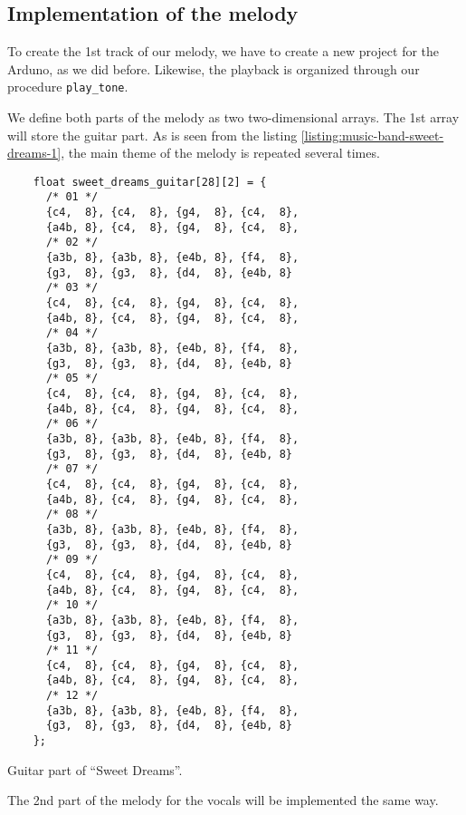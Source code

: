 \documentclass[../sparc.tex]{subfiles}
\begin{document}
\newpage
\subsection{Implementation of the melody}

To create the 1st track of our melody, we have to create a new project for the
Arduno, as we did before.  Likewise, the playback is organized through our
procedure \texttt{play\_tone}.

We define both parts of the melody as two two-dimensional arrays.  The 1st array
will store the guitar part.  As is seen from the listing
\ref{listing:music-band-sweet-dreams-1}, the main theme of the melody is
repeated several times.

\begin{listing}[H]
  \begin{verbatim}
    float sweet_dreams_guitar[28][2] = {
      /* 01 */
      {c4,  8}, {c4,  8}, {g4,  8}, {c4,  8},
      {a4b, 8}, {c4,  8}, {g4,  8}, {c4,  8},
      /* 02 */
      {a3b, 8}, {a3b, 8}, {e4b, 8}, {f4,  8},
      {g3,  8}, {g3,  8}, {d4,  8}, {e4b, 8}
      /* 03 */
      {c4,  8}, {c4,  8}, {g4,  8}, {c4,  8},
      {a4b, 8}, {c4,  8}, {g4,  8}, {c4,  8},
      /* 04 */
      {a3b, 8}, {a3b, 8}, {e4b, 8}, {f4,  8},
      {g3,  8}, {g3,  8}, {d4,  8}, {e4b, 8}
      /* 05 */
      {c4,  8}, {c4,  8}, {g4,  8}, {c4,  8},
      {a4b, 8}, {c4,  8}, {g4,  8}, {c4,  8},
      /* 06 */
      {a3b, 8}, {a3b, 8}, {e4b, 8}, {f4,  8},
      {g3,  8}, {g3,  8}, {d4,  8}, {e4b, 8}
      /* 07 */
      {c4,  8}, {c4,  8}, {g4,  8}, {c4,  8},
      {a4b, 8}, {c4,  8}, {g4,  8}, {c4,  8},
      /* 08 */
      {a3b, 8}, {a3b, 8}, {e4b, 8}, {f4,  8},
      {g3,  8}, {g3,  8}, {d4,  8}, {e4b, 8}
      /* 09 */
      {c4,  8}, {c4,  8}, {g4,  8}, {c4,  8},
      {a4b, 8}, {c4,  8}, {g4,  8}, {c4,  8},
      /* 10 */
      {a3b, 8}, {a3b, 8}, {e4b, 8}, {f4,  8},
      {g3,  8}, {g3,  8}, {d4,  8}, {e4b, 8}
      /* 11 */
      {c4,  8}, {c4,  8}, {g4,  8}, {c4,  8},
      {a4b, 8}, {c4,  8}, {g4,  8}, {c4,  8},
      /* 12 */
      {a3b, 8}, {a3b, 8}, {e4b, 8}, {f4,  8},
      {g3,  8}, {g3,  8}, {d4,  8}, {e4b, 8}
    };
  \end{verbatim}
  \caption{Guitar part of ``Sweet Dreams''.}
  \label{listing:music-band-sweet-dreams-1}
\end{listing}

The 2nd part of the melody for the vocals will be implemented the same way.
\end{document}
